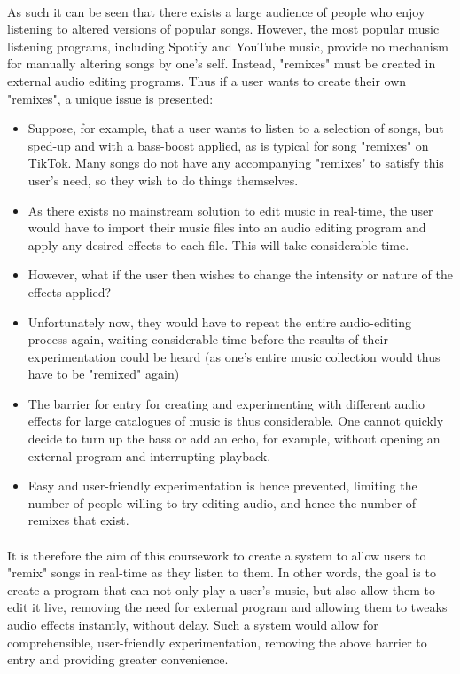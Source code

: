 \paragraph{}
As such it can be seen that there exists a large audience of people who enjoy listening to altered versions of popular songs. However, the most popular music listening programs, including Spotify and YouTube music, provide no mechanism for manually altering songs by one's self. Instead, "remixes" must be created in external audio editing programs. Thus if a user wants to create their own "remixes", a unique issue is presented:
\begin{itemize}
	\item Suppose, for example, that a user wants to listen to a selection of songs, but sped-up and with a bass-boost applied, as is typical for song "remixes" on TikTok. Many songs do not have any accompanying "remixes" to satisfy this user's need, so they wish to do things themselves.
	\item As there exists no mainstream solution to edit music in real-time, the user would have to import their music files into an audio editing program and apply any desired effects to each file. This will take considerable time.
	\item However, what if the user then wishes to change the intensity or nature of the effects applied?
	\item Unfortunately now, they would have to repeat the entire audio-editing process again, waiting considerable time before the results of their experimentation could be heard (as one's entire music collection would thus have to be "remixed" again)
	\item The barrier for entry for creating and experimenting with different audio effects for large catalogues of music is thus considerable. One cannot quickly decide to turn up the bass or add an echo, for example, without opening an external program and interrupting playback.
	\item Easy and user-friendly experimentation is hence prevented, limiting the number of people willing to try editing audio, and hence the number of remixes that exist.
\end{itemize}

\paragraph{}
It is therefore the aim of this coursework to create a system to allow users to "remix" songs in real-time as they listen to them. In other words, the goal is to create a program that can not only play a user's music, but also allow them to edit it live, removing the need for external program and allowing them to tweaks audio effects instantly, without delay. Such a system would allow for comprehensible, user-friendly experimentation, removing the above barrier to entry and providing greater convenience.

